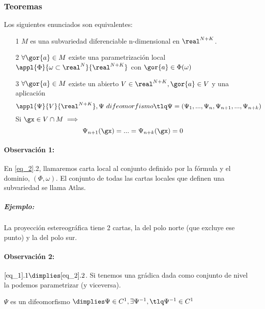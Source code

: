 \subsubsection{Teoremas}
\begin{theorem}
Los siguientes enunciados son equivalentes:
\begin{itemize}
\item[1] $M$ es una subvariedad diferenciable n-dimensional en $\real^{N+K}$. \label{eq_1}
\item[2] $\forall \gor{a} \in M $ existe una parametrización local $\appl{\Phi}{\omega\subset \real^N}{\real^{N+K}}$ con $\gor{a}\in \Phi(\omega)$\label{eq_2}
\item[3] $\forall \gor{a} \in M$ existe un abierto $V\in \real^{N+K}, \gor{a}\in V$ y una aplicación 
\label{eq_3}
\[\appl{\Psi}{V}{\real^{N+K}}, \Psi\ difeomorfismo \tlq \Psi = (\Psi_1,...,\Psi_n,\Psi_{n+1},...,\Psi_{n+k})\]
Si $\gx \in V\cap M \implies$
\[\Psi_{n+1}(\gx) = ... = \Psi_{n+k}(\gx) = 0\]
\end{itemize}
\end{theorem}
 
 \paragraph{Observación 1:} En \ref{eq_2}.2, llamaremos carta local al conjunto definido por la fórmula y el dominio, $(\Phi,\omega)$. El conjunto de todas las cartas locales que definen una subvariedad se llama Atlas.
 
 \subparagraph{Ejemplo:} 
 
 La proyección estereográfica tiene 2 cartas, la del polo norte (que excluye ese punto) y la del polo sur.
 
 \paragraph{Observación 2:} $\ref{eq_1}.1 \dimplies \ref{eq_2}.2$. Si tenemos una grádica dada como conjunto de nivel la podemos parametrizar (y viceversa).
 
\begin{defn}[Difeomorfismo]
$\Psi$ es un difeomorfismo $\dimplies \Psi\in C^1,\exists \Psi^{-1}, \tlq \Psi^{-1}\in C^1$
\end{defn}
 


